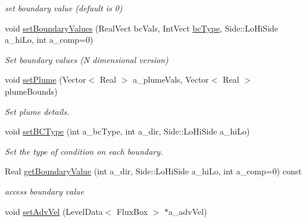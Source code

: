 \begin{DoxyCompactItemize}
\begin{DoxyCompactList}\small\item\em set boundary value (default is 0) \end{DoxyCompactList}\item 
\hypertarget{class_advect_i_b_c_aa03fa005397fe7ba2f40dfd0e4762f66}{void \hyperlink{class_advect_i_b_c_aa03fa005397fe7ba2f40dfd0e4762f66}{set\-Boundary\-Values} (Real\-Vect bc\-Vals, Int\-Vect \hyperlink{class_advect_i_b_c_ad4d8474d7904dab87483522ebe711b8e}{bc\-Type}, Side\-::\-Lo\-Hi\-Side a\-\_\-hi\-Lo, int a\-\_\-comp=0)}\label{class_advect_i_b_c_aa03fa005397fe7ba2f40dfd0e4762f66}

\begin{DoxyCompactList}\small\item\em Set boundary values (N dimensional version) \end{DoxyCompactList}\item 
\hypertarget{class_advect_i_b_c_a559e2f450c3ccbff23ba713d508117d5}{void \hyperlink{class_advect_i_b_c_a559e2f450c3ccbff23ba713d508117d5}{set\-Plume} (Vector$<$ Real $>$ a\-\_\-plume\-Vals, Vector$<$ Real $>$ plume\-Bounds)}\label{class_advect_i_b_c_a559e2f450c3ccbff23ba713d508117d5}

\begin{DoxyCompactList}\small\item\em Set plume details. \end{DoxyCompactList}\item 
\hypertarget{class_advect_i_b_c_abeb87fbdca5e7f2711161712734c3f9e}{void \hyperlink{class_advect_i_b_c_abeb87fbdca5e7f2711161712734c3f9e}{set\-B\-C\-Type} (int a\-\_\-bc\-Type, int a\-\_\-dir, Side\-::\-Lo\-Hi\-Side a\-\_\-hi\-Lo)}\label{class_advect_i_b_c_abeb87fbdca5e7f2711161712734c3f9e}

\begin{DoxyCompactList}\small\item\em Set the type of condition on each boundary. \end{DoxyCompactList}\item 
\hypertarget{class_advect_i_b_c_adabceffc28ca37c3be7a6fc3f674c69b}{Real \hyperlink{class_advect_i_b_c_adabceffc28ca37c3be7a6fc3f674c69b}{get\-Boundary\-Value} (int a\-\_\-dir, Side\-::\-Lo\-Hi\-Side a\-\_\-hi\-Lo, int a\-\_\-comp=0) const }\label{class_advect_i_b_c_adabceffc28ca37c3be7a6fc3f674c69b}

\begin{DoxyCompactList}\small\item\em access boundary value \end{DoxyCompactList}\item 
\hypertarget{class_advect_i_b_c_a28147c7f8464b4f5ce98813a277799ad}{void \hyperlink{class_advect_i_b_c_a28147c7f8464b4f5ce98813a277799ad}{set\-Adv\-Vel} (Level\-Data$<$ Flux\-Box $>$ $\ast$a\-\_\-adv\-Vel)}\label{class_advect_i_b_c_a28147c7f8464b4f5ce98813a277799ad}


\end{DoxyCompactItemize}

